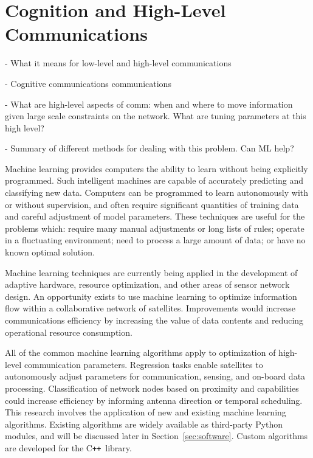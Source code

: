 \documentclass[conference]{IEEEtran}
\newcommand{\cpp}{C\texttt{++}~}
\begin{document}



\section{Cognition and High-Level Communications}
\label{sec:hlc}

{\color{red}
  - What it means for low-level and high-level communications

  - Cognitive communications communications

  - What are high-level aspects of comm: when and where to move information
  given large scale constraints on the network. What are tuning parameters at
  this high level?

  - Summary of different methods for dealing with this problem. Can ML help?
}

Machine learning provides computers the ability to learn without being
explicitly programmed.  Such intelligent machines are capable of accurately
predicting and classifying new data.  Computers can be programmed to learn
autonomously with or without supervision, and often require significant
quantities of training data and careful adjustment of model parameters.  These
techniques are useful for the problems which: require many manual adjustments or
long lists of rules; operate in a fluctuating environment; need to process a
large amount of data; or have no known optimal solution.

Machine learning techniques are currently being applied in the development of
adaptive hardware, resource optimization, and other areas of sensor network
design.  An opportunity exists to use machine learning to optimize information
flow within a collaborative network of satellites.  Improvements would increase
communications efficiency by increasing the value of data contents and reducing
operational resource consumption.

All of the common machine learning algorithms apply to optimization of
high-level communication parameters.  Regression tasks enable satellites to
autonomously adjust parameters for communication, sensing, and on-board data
processing.  Classification of network nodes based on proximity and capabilities
could increase efficiency by informing antenna direction or temporal scheduling.
This research involves the application of new and existing machine learning
algorithms.  Existing algorithms are widely available as third-party Python
modules, and will be discussed later in Section~\ref{sec:software}.  Custom
algorithms are developed for the \cpp library.
\end{document}
